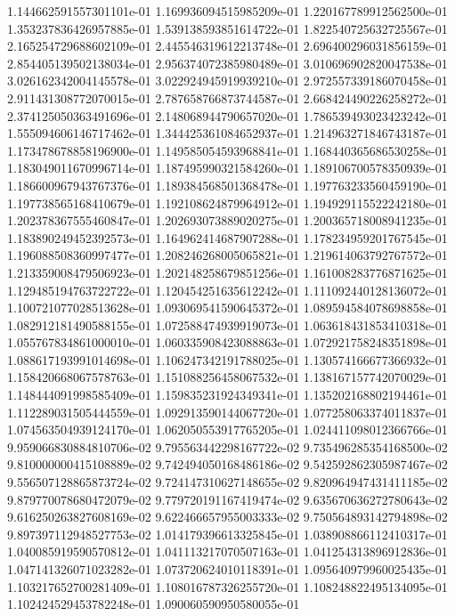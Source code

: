1.144662591557301101e-01
1.169936094515985209e-01
1.220167789912562500e-01
1.353237836426957885e-01
1.539138593851614722e-01
1.822540725632725567e-01
2.165254729688602109e-01
2.445546319612213748e-01
2.696400296031856159e-01
2.854405139502138034e-01
2.956374072385980489e-01
3.010696902820047538e-01
3.026162342004145578e-01
3.022924945919939210e-01
2.972557339186070458e-01
2.911431308772070015e-01
2.787658766873744587e-01
2.668424490226258272e-01
2.374125050363491696e-01
2.148068944790657020e-01
1.786539493023423242e-01
1.555094606146717462e-01
1.344425361084652937e-01
1.214963271846743187e-01
1.173478678858196900e-01
1.149585054593968841e-01
1.168440365686530258e-01
1.183049011670996714e-01
1.187495990321584260e-01
1.189106700578350939e-01
1.186600967943767376e-01
1.189384568501368478e-01
1.197763233560459190e-01
1.197738565168410679e-01
1.192108624879964912e-01
1.194929115522242180e-01
1.202378367555460847e-01
1.202693073889020275e-01
1.200365718008941235e-01
1.183890249452392573e-01
1.164962414687907288e-01
1.178234959201767545e-01
1.196088508360997477e-01
1.208246268005065821e-01
1.219614063792767572e-01
1.213359008479506923e-01
1.202148258679851256e-01
1.161008283776871625e-01
1.129485194763722722e-01
1.120454251635612242e-01
1.111092440128136072e-01
1.100721077028513628e-01
1.093069541590645372e-01
1.089594584078698858e-01
1.082912181490588155e-01
1.072588474939919073e-01
1.063618431853410318e-01
1.055767834861000010e-01
1.060335908423088863e-01
1.072921758248351898e-01
1.088617193991014698e-01
1.106247342191788025e-01
1.130574166677366932e-01
1.158420668067578763e-01
1.151088256458067532e-01
1.138167157742070029e-01
1.148444091998585409e-01
1.159835231924349341e-01
1.135202168802194461e-01
1.112289031505444559e-01
1.092913590144067720e-01
1.077258063374011837e-01
1.074563504939124170e-01
1.062050553917765205e-01
1.024411098012366766e-01
9.959066830884810706e-02
9.795563442298167722e-02
9.735496285354168500e-02
9.810000000415108889e-02
9.742494050168486186e-02
9.542592862305987467e-02
9.556507128865873724e-02
9.724147310627148655e-02
9.820964947431411185e-02
9.879770078680472079e-02
9.779720191167419474e-02
9.635670636272780643e-02
9.616250263827608169e-02
9.622466657955003333e-02
9.750564893142794898e-02
9.897397112948527753e-02
1.014179396613325845e-01
1.038908866112410317e-01
1.040085919590570812e-01
1.041113217070507163e-01
1.041254313896912836e-01
1.047141326071023282e-01
1.073720624010118391e-01
1.095640979960025435e-01
1.103217652700281409e-01
1.108016787326255720e-01
1.108248822495134095e-01
1.102424529453782248e-01
1.090060590950580055e-01
